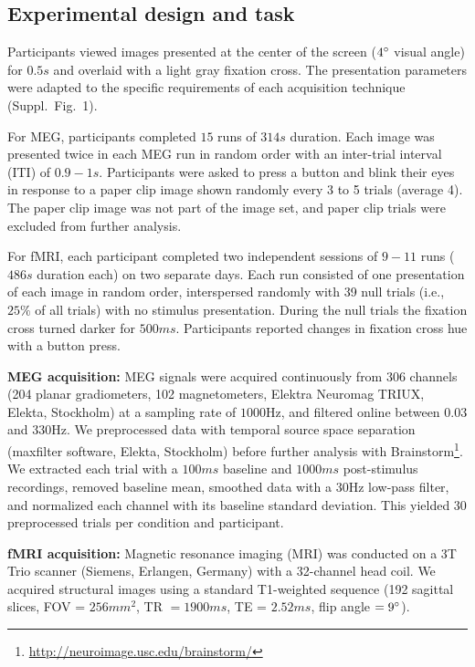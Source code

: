\documentclass[10pt,twocolumn,letterpaper]{article}
\begin{document}
\subsection{Experimental design and task}
Participants viewed images presented at the center of the screen ($4\degree$ visual angle) for $0.5s$ and overlaid with a light gray fixation cross. The presentation parameters were adapted to the specific requirements of each acquisition technique (Suppl.~Fig.~1).

For MEG, participants completed $15$ runs of $314s$ duration. Each image was presented twice in each MEG run in random order with an inter-trial interval (ITI) of $0.9-1s$. Participants were asked to press a button and blink their eyes in response to a paper clip image shown randomly every 3 to 5 trials (average 4). The paper clip image was not part of the image set, and paper clip trials were excluded from further analysis.

For fMRI, each participant completed two independent sessions of $9-11$ runs ($486 s$ duration each) on two separate days. Each run consisted of one presentation of each image in random order, interspersed randomly with 39 null trials (i.e., $25\%$ of all trials) with no stimulus presentation. During the null trials the fixation cross turned darker for $500ms$. Participants reported changes in fixation cross hue with a button press.

\newpage
\textbf{MEG acquisition:}
MEG signals were acquired continuously from 306 channels (204 planar gradiometers, 102 magnetometers, Elektra Neuromag TRIUX, Elekta, Stockholm) at a sampling rate of $1000$Hz, and filtered online between $0.03$ and 330Hz. We preprocessed data with temporal source space separation (maxfilter software, Elekta, Stockholm) before further analysis with Brainstorm\footnote{\href{http://neuroimage.usc.edu/brainstorm/}{http://neuroimage.usc.edu/brainstorm/}}. We extracted each trial with a $100ms$ baseline and $1000ms$ post-stimulus recordings, removed baseline mean, smoothed data with a 30Hz low-pass filter, and normalized each channel with its baseline standard deviation. This yielded 30 preprocessed trials per condition and participant.

\textbf{fMRI acquisition:}
Magnetic resonance imaging (MRI) was conducted on a 3T Trio scanner (Siemens, Erlangen, Germany) with a 32-channel head coil. We acquired structural images using a standard T1-weighted sequence (192 sagittal slices, FOV = $256 mm^2$, TR $= 1900ms$, TE = $2.52 ms$, flip angle $= 9\degree$).
\end{document}

